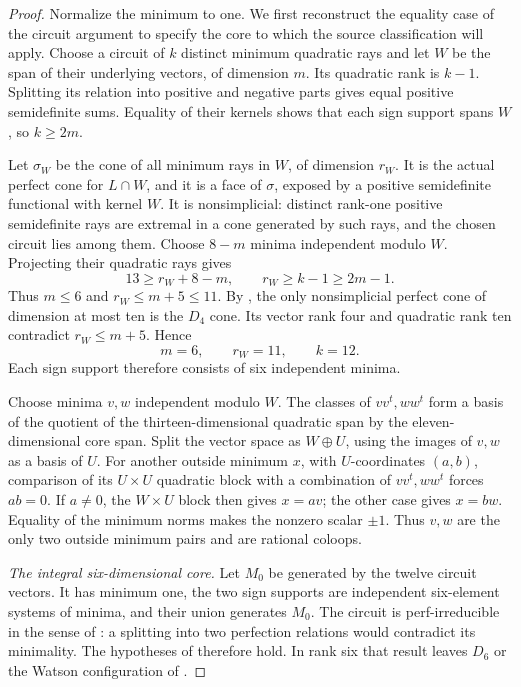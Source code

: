 \begin{proof}
Normalize the minimum to one. We first reconstruct the equality case
of the circuit argument to specify the core to which the source
classification will apply. Choose a circuit of $k$ distinct minimum
quadratic rays and let $W$ be the span of their underlying vectors,
of dimension $m$. Its quadratic rank is $k-1$. Splitting its relation
into positive and negative parts gives equal positive semidefinite
sums. Equality of their kernels shows that each sign support spans
$W$, so $k\geq2m$.

Let $\sigma_W$ be the cone of all minimum rays in $W$, of dimension
$r_W$. It is the actual perfect cone for $L\cap W$, and it is a face
of $\sigma$, exposed by a positive semidefinite functional with
kernel $W$. It is nonsimplicial: distinct rank-one positive
semidefinite rays are extremal in a cone generated by such rays,
and the chosen circuit lies among them. Choose $8-m$ minima
independent modulo $W$. Projecting their quadratic rays gives
\[
 13\geq r_W+8-m,
 \qquad r_W\geq k-1\geq2m-1.
\]
Thus $m\leq6$ and $r_W\leq m+5\leq11$.
By \cite[Theorem~1.1(ii)]{DutourHulekSchurmann2015}, the only
nonsimplicial perfect cone of dimension at most ten is the $D_4$
cone. Its vector rank four and quadratic rank ten contradict
$r_W\leq m+5$. Hence
\[
             m=6,\qquad r_W=11,\qquad k=12.             \tag{R8.1}
\]
Each sign support therefore consists of six independent minima.

Choose minima $v,w$ independent modulo $W$. The classes of
$vv^t,ww^t$ form a basis of the quotient of the thirteen-dimensional
quadratic span by the eleven-dimensional core span. Split the vector
space as $W\oplus U$, using the images of $v,w$ as a basis of $U$.
For another outside minimum $x$, with $U$-coordinates $(a,b)$,
comparison of its $U\times U$ quadratic block with a combination
of $vv^t,ww^t$ forces $ab=0$. If $a\ne0$, the $W\times U$ block
then gives $x=av$; the other case gives $x=bw$. Equality of the
minimum norms makes the nonzero scalar $\pm1$. Thus $v,w$ are the
only two outside minimum pairs and are rational coloops.

\medskip\noindent
\emph{The integral six-dimensional core.}
Let $M_0$ be generated by the twelve circuit vectors. It has minimum
one, the two sign supports are independent six-element systems of
minima, and their union generates $M_0$. The circuit is
perf-irreducible in the sense of
\cite[Definition~2.4 and \S3]{BergeMartinet2009}: a splitting into
two perfection relations would contradict its minimality.
The hypotheses of \cite[Corollary~6.9]{BergeMartinet2009} therefore
hold. In rank six that result leaves $D_6$ or the Watson
configuration of \cite[Theorem~5.1]{BergeMartinet2009}.


\end{proof}

